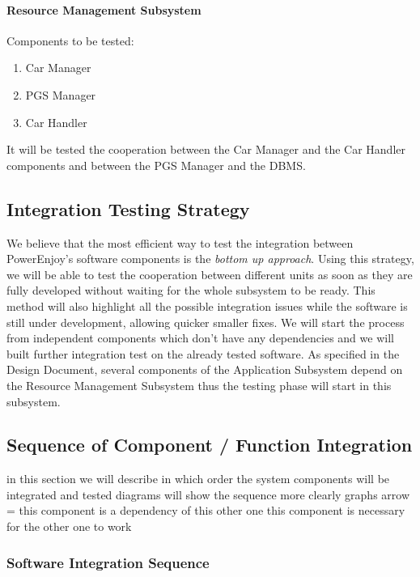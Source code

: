 \documentclass[english]{article}
\begin{document}
\paragraph{Resource Management Subsystem}
Components to be tested:
\begin{enumerate}
\item Car Manager
\item PGS Manager
\item Car Handler
\end{enumerate}

It will be tested the cooperation between the Car Manager and the Car Handler components and between the PGS Manager and the DBMS.



\subsection{Integration Testing Strategy}
We believe that the most efficient way to test the integration between PowerEnjoy's software components is the \emph{bottom up approach}. Using this strategy, we will be able to test the cooperation between different units as soon as they are fully developed without waiting for the whole subsystem to be ready. This method will also highlight all the possible integration issues while the software is still under development, allowing quicker smaller fixes.
We will start the process from independent components which don't have any dependencies and we will built further integration test on the already  tested software.
As specified in the Design Document, several components of the Application Subsystem depend on the Resource Management Subsystem thus the testing phase will start in this subsystem.


\subsection{Sequence of Component / Function Integration}

in this section we will describe in which order the system components will be integrated and tested
diagrams will show the sequence more clearly
graphs
arrow = this component is a dependency of this other one
this component is necessary for the other one to work


\subsubsection{Software Integration Sequence}
\end{document}
